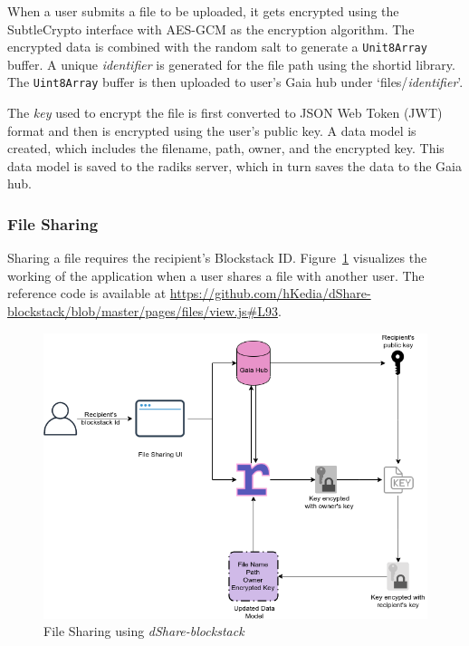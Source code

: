 When a user submits a file to be uploaded, it gets encrypted using the SubtleCrypto interface with AES-GCM as the encryption algorithm. The encrypted data is combined with the random salt to generate a \texttt{Unit8Array} buffer. A unique \textit{identifier} is generated for the file path using the shortid\cite{github:shortid:1} library. The \texttt{Uint8Array} buffer is then uploaded to user's Gaia hub under `files/{\textit{identifier}}'.

The \textit{key} used to encrypt the file is first converted to JSON Web Token (JWT) \cite{rfc7519} format and then is encrypted using the user's public key. A data model is created, which includes the filename, path, owner, and the encrypted key. This data model is saved to the radiks server, which in turn saves the data to the Gaia hub.

\subsubsection{File Sharing}
Sharing a file requires the recipient's Blockstack ID. Figure~\ref{fig:blockstack-share} visualizes the working of the application when a user shares a file with another user. The reference code is available at \url{https://github.com/hKedia/dShare-blockstack/blob/master/pages/files/view.js#L93}.

\begin{figure}[h]
	\includegraphics[width=\linewidth]{figures/blockstack-share}
	\caption{\label{fig:blockstack-share} File Sharing using \textit{dShare-blockstack}}
\end{figure}

